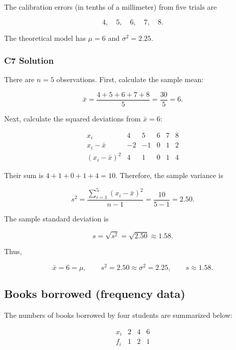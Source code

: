 The calibration errors (in tenths of a millimeter) from five trials are

\[
4,\quad5,\quad6,\quad7,\quad8.
\]

The theoretical model has $\mu=6$ and $\sigma^2=2.25$.


\subsubsection*{C7 Solution}
\label{subsec:c7-only-raw-solution}

There are $n=5$ observations. First, calculate the sample mean:

\[
\bar{x}
=\frac{4+5+6+7+8}{5}
=\frac{30}{5}
=6.
\]

Next, calculate the squared deviations from $\bar{x}=6$:

\[
\begin{array}{c|ccccc}
	x_i & 4 & 5 & 6 & 7 & 8 \\ \hline
	x_i-\bar{x} & -2 & -1 & 0 & 1 & 2 \\
	(x_i-\bar{x})^2 & 4 & 1 & 0 & 1 & 4
\end{array}
\]

Their sum is $4+1+0+1+4=10$. Therefore, the sample variance is

\[
s^2
=\frac{\sum_{i=1}^{5}(x_i-\bar{x})^2}{n-1}
=\frac{10}{5-1}
=2.50.
\]

The sample standard deviation is

\[
s=\sqrt{s^2}=\sqrt{2.50}\approx1.58.
\]

Thus,

\[
\boxed{\bar{x}=6=\mu,\qquad
s^2=2.50\approx\sigma^2=2.25,\qquad s\approx1.58.}
\]


\subsection{Books borrowed (frequency data)}
\label{sec:c7-only-frequency}

The numbers of books borrowed by four students are summarized below:

\[
\begin{array}{c|ccc}
	x_i & 2 & 4 & 6 \\ \hline
	f_i & 1 & 2 & 1
\end{array}
\]

